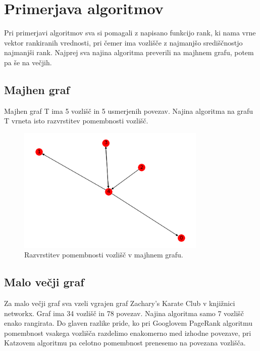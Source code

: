 \documentclass[a4paper]{article}
\begin{document}
\section{Primerjava algoritmov}
Pri primerjavi algoritmov sva si pomagali z napisano funkcijo rank, ki nama vrne vektor rankiranih vrednosti, pri čemer ima vozlišče z najmanjšo središčnostjo najmanjši rank. Najprej sva najina algoritma preverili na majhnem grafu, potem pa še na večjih. 

\subsection{Majhen graf}
Majhen graf T ima 5 vozlišč in 5 usmerjenih povezav. Najina algoritma na grafu T vrneta isto razvrstitev pomembnosti vozlišč. 

\begin{figure}[h]
\begin{center} 
\includegraphics[width=9cm]{T_graph.png}
\caption[Razvrstitev pomembnosti vozlišč v majhnem grafu]{Razvrstitev pomembnosti vozlišč v majhnem grafu.}
\end{center}
\end{figure}

\subsection{Malo večji graf}
Za malo večji graf sva vzeli vgrajen graf Zachary's Karate Club v knjižnici networkx. Graf ima 34 vozlišč in 78 povezav. Najina algoritma samo 7 vozlišč enako rangirata. Do glaven razlike pride, ko pri Googlovem PageRank algoritmu pomembnost vsakega vozlišča razdelimo enakomerno med izhodne povezave, pri Katzovem algoritmu pa celotno pomembnost prenesemo na povezana vozlišča. 
\end{document}
